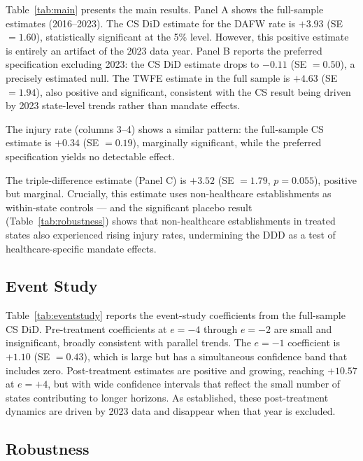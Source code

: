 \documentclass[12pt]{article}
\begin{document}


Table~\ref{tab:main} presents the main results. Panel A shows the full-sample estimates (2016--2023). The CS DiD estimate for the DAFW rate is $+3.93$ (SE $= 1.60$), statistically significant at the 5\% level. However, this positive estimate is entirely an artifact of the 2023 data year. Panel B reports the preferred specification excluding 2023: the CS DiD estimate drops to $-0.11$ (SE $= 0.50$), a precisely estimated null. The TWFE estimate in the full sample is $+4.63$ (SE $= 1.94$), also positive and significant, consistent with the CS result being driven by 2023 state-level trends rather than mandate effects.

The injury rate (columns 3--4) shows a similar pattern: the full-sample CS estimate is $+0.34$ (SE $= 0.19$), marginally significant, while the preferred specification yields no detectable effect.

The triple-difference estimate (Panel C) is $+3.52$ (SE $= 1.79$, $p = 0.055$), positive but marginal. Crucially, this estimate uses non-healthcare establishments as within-state controls --- and the significant placebo result (Table~\ref{tab:robustness}) shows that non-healthcare establishments in treated states also experienced rising injury rates, undermining the DDD as a test of healthcare-specific mandate effects.

\subsection{Event Study}



Table~\ref{tab:eventstudy} reports the event-study coefficients from the full-sample CS DiD. Pre-treatment coefficients at $e = -4$ through $e = -2$ are small and insignificant, broadly consistent with parallel trends. The $e = -1$ coefficient is $+1.10$ (SE $= 0.43$), which is large but has a simultaneous confidence band that includes zero. Post-treatment estimates are positive and growing, reaching $+10.57$ at $e = +4$, but with wide confidence intervals that reflect the small number of states contributing to longer horizons. As established, these post-treatment dynamics are driven by 2023 data and disappear when that year is excluded.

\subsection{Robustness}
\end{document}
